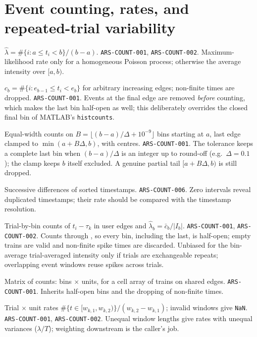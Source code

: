 \section{Event counting, rates, and repeated-trial variability}
{$\hat\lambda=\#\{i:a\le t_i<b\}/(b-a)$.}
{\texttt{ARS-COUNT-001}, \texttt{ARS-COUNT-002}.}
{Maximum-likelihood rate only for a homogeneous Poisson process; otherwise the average intensity over $[a,b)$.}

{$c_b=\#\{i:e_{b-1}\le t_i<e_b\}$ for arbitrary increasing edges; non-finite times are dropped.}
{\texttt{ARS-COUNT-001}.}
{Events at the final edge are removed \emph{before} counting, which makes the last bin half-open as well; this deliberately overrides the closed final bin of MATLAB's \texttt{histcounts}.}

{Equal-width counts on $B=\lfloor(b-a)/\Delta+10^{-9}\rfloor$ bins starting at $a$, last edge clamped to $\min(a+B\Delta,b)$, with centres.}
{\texttt{ARS-COUNT-001}.}
{The tolerance keeps a complete last bin when $(b-a)/\Delta$ is an integer up to round-off (e.g.\ $\Delta=0.1$); the clamp keeps $b$ itself excluded. A genuine partial tail $[a+B\Delta,b)$ is still dropped.}

{Successive differences of sorted timestamps.}
{\texttt{ARS-COUNT-006}.}
{Zero intervals reveal duplicated timestamps; their rate should be compared with the timestamp resolution.}

{Trial-by-bin counts of $t_i-\tau_k$ in user edges and $\hat\lambda_b=\bar c_b/|I_b|$.}
{\texttt{ARS-COUNT-001}, \texttt{ARS-COUNT-002}.}
{Counts through , so every bin, including the last, is half-open; empty trains are valid and non-finite spike times are discarded. Unbiased for the bin-average trial-averaged intensity only if trials are exchangeable repeats; overlapping event windows reuse spikes across trials.}

{Matrix of  counts: bins $\times$ units, for a cell array of trains on shared edges.}
{\texttt{ARS-COUNT-001}.}
{Inherits half-open bins and the dropping of non-finite times.}

{Trial $\times$ unit rates $\#\{t\in[w_{k,1},w_{k,2})\}/(w_{k,2}-w_{k,1})$; invalid windows give \texttt{NaN}.}
{\texttt{ARS-COUNT-001}, \texttt{ARS-COUNT-002}.}
{Unequal window lengths give rates with unequal variances ($\lambda/T$); weighting downstream is the caller's job.}

